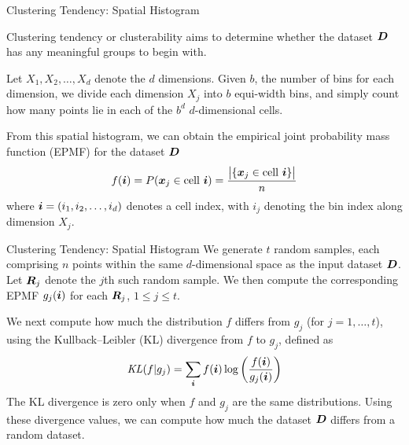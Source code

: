 \begin{frame}{Clustering Tendency: Spatial Histogram}

Clustering tendency or clusterability
aims to determine whether the dataset ${\boldsymbol D}$ has any
meaningful groups to begin with. 

\medskip
Let $X_1, X_2, \ldots, X_d$ denote the $d$ dimensions. Given
$b$, the number of bins for each dimension, we divide each dimension
$X_{j}$ into $b$ equi-width bins, and simply count how many points lie in
each of the $b^d$ $d$-dimensional cells.  

\medskip
From this spatial histogram, we
can obtain the empirical joint probability mass function (EPMF) for the
dataset ${\boldsymbol D}$
\begin{align*}
  f({\boldsymbol i}) = P({\boldsymbol x}_{j} \in \text{cell }{\boldsymbol i}) =
  \frac{\bigl|\{{\boldsymbol x}_{j} \in \text{cell }{\boldsymbol i}\}\bigr|}{n}
\end{align*}
where ${\boldsymbol i} = (i_1,i_2,\ldots,i_d)$ denotes a cell index, with $i_{j}$
denoting
the bin index along dimension $X_{j}$.
\end{frame}


\begin{frame}{Clustering Tendency: Spatial Histogram}
We generate $t$ random samples, each comprising $n$ points within
the same $d$-dimensional space as the input dataset ${\boldsymbol D}$.  
Let ${\boldsymbol R}_{j}$
denote the $j$th such random sample. 
We then compute the
corresponding EPMF $g_{j}({\boldsymbol i})$ for each ${\boldsymbol R}_{j}$, $1\le j\le t$.

\medskip
We next compute how much the distribution $f$ differs from
$g_{j}$ (for $j=1,\ldots,t$),
using the Kullback--Leibler (KL) divergence from $f$ to
$g_{j}$, def\/{i}ned as
\begin{align*}
  \mathit{KL}(f|g_{j}) = \sum_{{\boldsymbol i}} f({\boldsymbol i}) \log \left(\frac{f({\boldsymbol i})}{g_{j}({\boldsymbol i})} \right)
\end{align*}
The KL divergence is zero only when $f$ and $g_{j}$ are the same
distributions. Using these divergence values, we can compute how much
the dataset ${\boldsymbol D}$ differs from a random dataset.
\end{frame}



